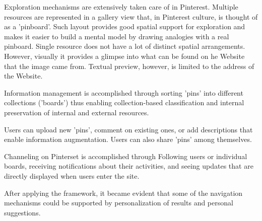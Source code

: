 {Exploration mechanisms are extensively taken care of in Pinterest. Multiple resources are represented in a gallery view that, in Pinterest culture, is thought of as a 'pinboard'. Such layout provides good spatial support for exploration and makes it easier to build a mental model by drawing analogies with a real pinboard. Single resource does not have a lot of distinct spatial arrangements. However, visually it provides a glimpse into what can be found on he Website that the image came from. Textual preview, however, is limited to the address of the Website.

Information management is accomplished through sorting 'pins' into different collections ('boards') thus enabling collection-based classification and internal preservation of internal and external resources. 

Users can upload new 'pins', comment on existing ones, or add descriptions that enable information augmentation. Users can also share 'pins' among themselves. 

Channeling on Pinterset is accomplished through Following users or individual boards, receiving notifications about their activities, and seeing updates that are directly displayed when users enter the site. 

After applying the framework, it became evident that some of the navigation mechanisms could be supported by personalization of results and personal suggestions.

} %


